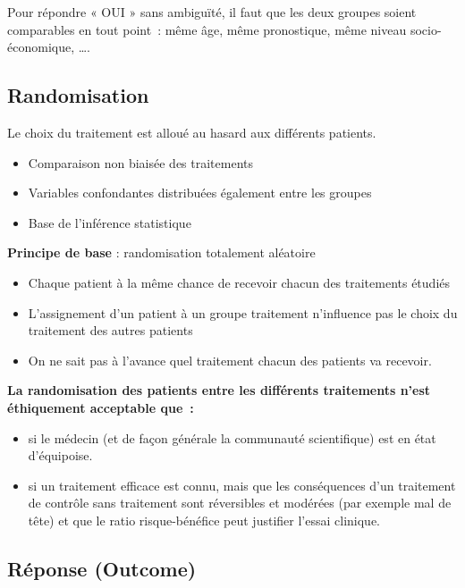 Pour répondre « OUI » sans ambiguïté, il faut que les deux
groupes soient comparables en tout point : même âge, même
pronostique, même niveau socio-économique, ….

\subsection{Randomisation}
Le choix du traitement est alloué au hasard aux différents patients.\\
\begin{itemize}
    \item Comparaison non biaisée des traitements
    \item Variables confondantes distribuées également entre les groupes
    \item Base de l’inférence statistique
\end{itemize}
\vspace{0.15cm}
\textbf{Principe de base} : randomisation totalement aléatoire\\
\begin{itemize}
    \item Chaque patient à la même chance de recevoir chacun des
traitements étudiés
    \item L’assignement d’un patient à un groupe traitement n’influence pas le choix du traitement des autres patients
    \item On ne sait pas à l’avance quel traitement chacun des patients va recevoir.
\end{itemize}
\vspace{0.15cm}
\textbf{La randomisation des patients entre les différents traitements n’est éthiquement acceptable que :}\\
\begin{itemize}
    \item si le médecin (et de façon générale la communauté scientifique) est en état d’équipoise.

\item si un traitement efficace est connu, mais que les conséquences d’un traitement de contrôle sans traitement sont réversibles et modérées (par exemple mal de tête) et que le ratio risque-bénéfice peut justifier l’essai clinique.
\end{itemize}

\subsection{Réponse (Outcome)}

